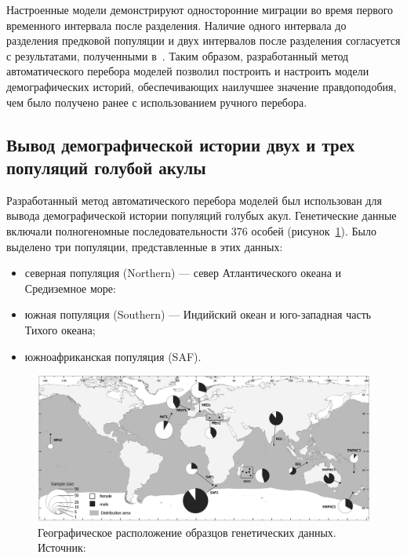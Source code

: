 Настроенные модели демонстрируют односторонние миграции во время первого временного интервала после разделения.
Наличие одного интервала до разделения предковой популяции и двух интервалов после разделения согласуется с результатами, полученными в~\cite{portik2017evaluating}.
Таким образом, разработанный метод автоматического перебора моделей позволил построить и настроить модели демографических историй, обеспечивающих наилучшее значение правдоподобия, чем было получено ранее с использованием ручного перебора.

\subsection{Вывод демографической истории двух и трех популяций голубой акулы}

Разработанный метод автоматического перебора моделей был использован для вывода демографической истории популяций голубых акул.
Генетические данные включали полногеномные последовательности 376 особей (рисунок~\ref{fig:part2:experiments:blue_shark:geogr}).
Было выделено три популяции, представленные в этих данных:
\begin{itemize}
    \item северная популяция (Northern) --- север Атлантического океана и Средиземное море:
    \item южная популяция (Southern) --- Индийский океан и юго-западная часть Тихого океана;
    \item южноафриканская популяция (SAF).
\end{itemize}

\begin{figure}[ht]
    \centering
        \includegraphics[width=\linewidth]{images_experiments/blue_shark/from_paper.jpg}
    \caption{Географическое расположение образцов генетических данных. Источник: \cite{nikolic2022stepping}}
    \label{fig:part2:experiments:blue_shark:geogr}
\end{figure}

